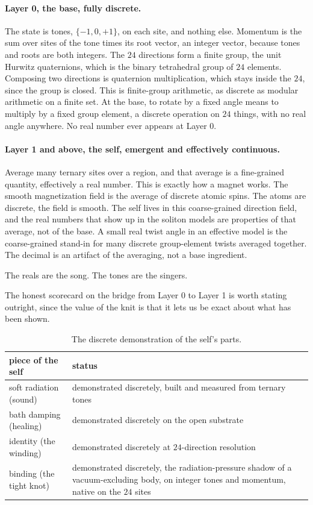 \paragraph{Layer 0, the base, fully discrete.} The state is tones, $\{-1, 0, +1\}$, on each site, and nothing else. Momentum is the sum over sites of the tone times its root vector, an integer vector, because tones and roots are both integers. The $24$ directions form a finite group, the unit Hurwitz quaternions, which is the binary tetrahedral group of $24$ elements. Composing two directions is quaternion multiplication, which stays inside the $24$, since the group is closed. This is finite-group arithmetic, as discrete as modular arithmetic on a finite set. At the base, to rotate by a fixed angle means to multiply by a fixed group element, a discrete operation on $24$ things, with no real angle anywhere. No real number ever appears at Layer 0.

\paragraph{Layer 1 and above, the self, emergent and effectively continuous.} Average many ternary sites over a region, and that average is a fine-grained quantity, effectively a real number. This is exactly how a magnet works. The smooth magnetization field is the average of discrete atomic spins. The atoms are discrete, the field is smooth. The self lives in this coarse-grained direction field, and the real numbers that show up in the soliton models are properties of that average, not of the base. A small real twist angle in an effective model is the coarse-grained stand-in for many discrete group-element twists averaged together. The decimal is an artifact of the averaging, not a base ingredient.

\begin{principle}
The reals are the song. The tones are the singers.
\end{principle}

The honest scorecard on the bridge from Layer 0 to Layer 1 is worth stating outright, since the value of the knit is that it lets us be exact about what has been shown.

\begin{table}[ht]
\centering
\begin{tabular}{@{}lp{}@{}}
\toprule
piece of the self & status \\
\midrule
soft radiation (sound) & demonstrated discretely, built and measured from ternary tones \\
bath damping (healing) & demonstrated discretely on the open substrate \\
identity (the winding) & demonstrated discretely at $24$-direction resolution \\
binding (the tight knot) & demonstrated discretely, the radiation-pressure shadow of a vacuum-excluding body, on integer tones and momentum, native on the $24$ sites \\
\bottomrule
\end{tabular}
\caption{The discrete demonstration of the self's parts.}
\label{tab:self-scorecard}
\end{table}

